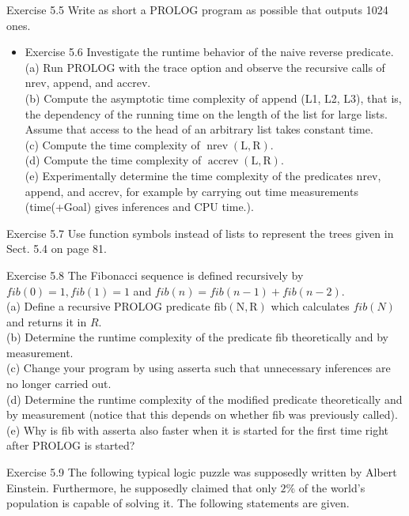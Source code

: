 \documentclass[10pt]{article}
\begin{document}
Exercise 5.5 Write as short a PROLOG program as possible that outputs 1024 ones.

\begin{itemize}
  \item Exercise 5.6 Investigate the runtime behavior of the naive reverse predicate.\\
(a) Run PROLOG with the trace option and observe the recursive calls of nrev, append, and accrev.\\
(b) Compute the asymptotic time complexity of append (L1, L2, L3), that is, the dependency of the running time on the length of the list for large lists. Assume that access to the head of an arbitrary list takes constant time.\\
(c) Compute the time complexity of $\operatorname{nrev}(\mathrm{L}, \mathrm{R})$.\\
(d) Compute the time complexity of $\operatorname{accrev}(\mathrm{L}, \mathrm{R})$.\\
(e) Experimentally determine the time complexity of the predicates nrev, append, and accrev, for example by carrying out time measurements (time(+Goal) gives inferences and CPU time.).
\end{itemize}

Exercise 5.7 Use function symbols instead of lists to represent the trees given in Sect. 5.4 on page 81.

Exercise 5.8 The Fibonacci sequence is defined recursively by $f i b(0)=1, f i b(1)=1$ and $f i b(n)=f i b(n-1)+f i b(n-2)$.\\
(a) Define a recursive PROLOG predicate $\mathrm{fib}(\mathrm{N}, \mathrm{R})$ which calculates $f i b(N)$ and returns it in $R$.\\
(b) Determine the runtime complexity of the predicate fib theoretically and by measurement.\\
(c) Change your program by using asserta such that unnecessary inferences are no longer carried out.\\
(d) Determine the runtime complexity of the modified predicate theoretically and by measurement (notice that this depends on whether fib was previously called).\\
(e) Why is fib with asserta also faster when it is started for the first time right after PROLOG is started?

Exercise 5.9 The following typical logic puzzle was supposedly written by Albert Einstein. Furthermore, he supposedly claimed that only $2 \%$ of the world's population is capable of solving it. The following statements are given.
\end{document}
